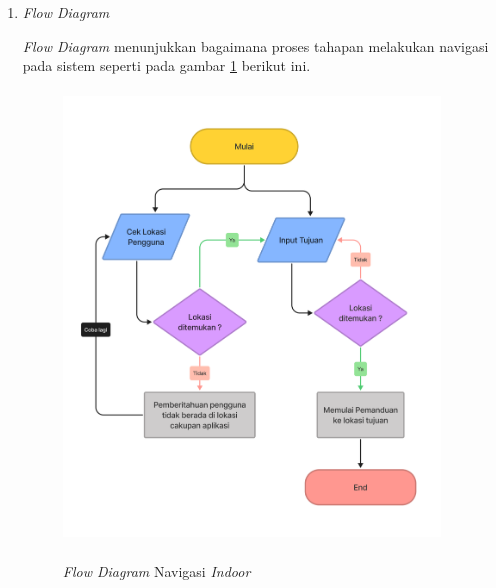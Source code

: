\begin{enumerate}
\begin{itemize}
\item \textit{Input} diterima dari pengguna setelah mengucapkan \textit{hotword}.

\item Pada proses 1 aplikasi dan perangkat akan memindai kekuatan sinyal BLE terdekat serta menentukan posisi pengguna.

\item Pada proses 2, setelah posisi pengguna ditentukan, aplikasi akan melakukan pengecekan \textit{input} dari pengguna pada \textit{database} lokasi menggunakan model yang telah tersedia oleh penelitian lainnya.

\item Pada proses 3, aplikasi akan memprediksi jarak tujuan serta rute terdekat menuju tujuan pengguna menggunakan algoritma Kalman Filter.

\item Hasil yang dihasilkan dari proses-proses sebelumnya berupa notifikasi dan vibrasi serta \textit{text-to-speech} atau berupa ucapan dari rute yang akan di tempuh oleh pengguna, seperti "Belok ke kanan dalam 5 langkah", "Telah sampai di tujuan , Ruangan Jurusan Informatika", dsb.
\end{itemize}

\item \textit{Flow Diagram}
\par \textit{Flow Diagram} menunjukkan bagaimana proses tahapan melakukan navigasi pada sistem seperti pada gambar \ref{img:flow_diagram_app} berikut ini.

\begin{figure}[H]
\centering
{\includegraphics [width = 10cm, height= 12cm]{gambar/bab3/flow_diagram_app}}
\caption{\textit{Flow Diagram} Navigasi \textit{Indoor}}
\label{img:flow_diagram_app}
\end{figure}


\end{enumerate}
